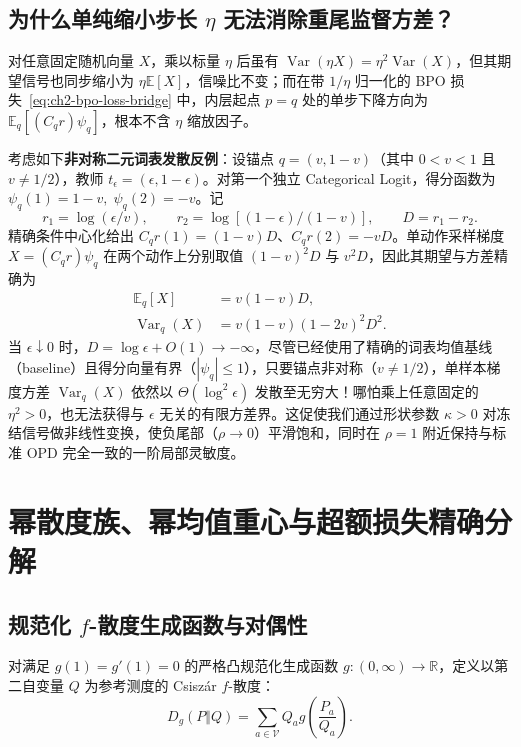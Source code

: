 \documentclass[lang=cn,scheme=chinese,openany]{elegantbook}
\newcommand{\E}{\mathbb E}
\newcommand{\Var}{\operatorname{Var}}
\newcommand{\R}{\mathbb R}
\begin{document}
\subsection{为什么单纯缩小步长 \texorpdfstring{$\eta$}{eta} 无法消除重尾监督方差？}

对任意固定随机向量 $X$，乘以标量 $\eta$ 后虽有 $\Var(\eta X)=\eta^2\Var(X)$，但其期望信号也同步缩小为 $\eta\E[X]$，信噪比不变；而在带 $1/\eta$ 归一化的 BPO 损失~\eqref{eq:ch2-bpo-loss-bridge} 中，内层起点 $p=q$ 处的单步下降方向为 $\E_q[(C_q r)\psi_q]$，根本不含 $\eta$ 缩放因子。

考虑如下\textbf{非对称二元词表发散反例}：设锚点 $q=(v,1-v)$（其中 $0<v<1$ 且 $v\ne 1/2$），教师 $t_\epsilon=(\epsilon,1-\epsilon)$。对第一个独立 Categorical Logit，得分函数为 $\psi_q(1)=1-v,\;\psi_q(2)=-v$。记
\begin{equation}
 r_1=\log(\epsilon/v),\qquad r_2=\log[(1-\epsilon)/(1-v)],\qquad D=r_1-r_2.
\end{equation}
精确条件中心化给出 $C_q r(1)=(1-v)D$、$C_q r(2)=-vD$。单动作采样梯度 $X=(C_q r)\psi_q$ 在两个动作上分别取值 $(1-v)^2 D$ 与 $v^2 D$，因此其期望与方差精确为
\begin{align}
 \E_q[X]&=v(1-v)D,\\
 \Var_q(X)&=v(1-v)(1-2v)^2 D^2.
 \label{eq:proximal-binary-variance}
\end{align}
当 $\epsilon\downarrow 0$ 时，$D=\log\epsilon+O(1)\to-\infty$，尽管已经使用了精确的词表均值基线（baseline）且得分向量有界（$|\psi_q|\le 1$），只要锚点非对称（$v\ne 1/2$），单样本梯度方差 $\Var_q(X)$ 依然以 $\Theta(\log^2\epsilon)$ 发散至无穷大！哪怕乘上任意固定的 $\eta^2>0$，也无法获得与 $\epsilon$ 无关的有限方差界。这促使我们通过形状参数 $\kappa>0$ 对冻结信号做非线性变换，使负尾部（$\rho\to 0$）平滑饱和，同时在 $\rho=1$ 附近保持与标准 OPD 完全一致的一阶局部灵敏度。

\section{幂散度族、幂均值重心与超额损失精确分解}
\label{sec:proximal-barycenters}
\label{sec:proximal-divergence-map}

\subsection{规范化 \texorpdfstring{$f$}{f}-散度生成函数与对偶性}

对满足 $g(1)=g'(1)=0$ 的严格凸规范化生成函数 $g:(0,\infty)\to\R$，定义以第二自变量 $Q$ 为参考测度的 Csisz\'ar $f$-散度：
\begin{equation}
 D_g(P\Vert Q)=\sum_{a\in\mathcal V} Q_a g\!\left(\frac{P_a}{Q_a}\right).
 \label{eq:divergence-map-csiszar}
\end{equation}
\end{document}
